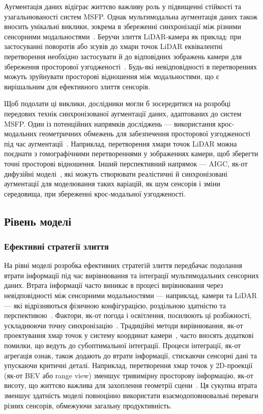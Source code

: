 Аугментація даних відіграє життєво важливу роль у підвищенні стійкості та узагальнюваності систем MSFP.
Однак мультимодальна аугментація даних також вносить унікальні виклики, зокрема в збереженні синхронізації між різними сенсорними модальностями~\cite{wang2021pointaugmenting, rangesh2021predicting}.
Беручи злиття LiDAR-камера як приклад: при застосуванні поворотів або зсувів до хмари точок LiDAR еквівалентні перетворення необхідно застосувати й до відповідних зображень камери для збереження просторової узгодженості~\cite{xiao2022polarmix}. Будь-які невідповідності в перетвореннях можуть зруйнувати просторові відношення між модальностями, що є вирішальним для ефективного злиття сенсорів.

Щоб подолати ці виклики, дослідники могли б зосередитися на розробці передових технік синхронізованої аугментації даних, адаптованих до систем MSFP. Один із потенційних напрямків досліджень — використання крос-модальних геометричних обмежень для забезпечення просторової узгодженості під час аугментації~\cite{yuan2023camera}.
Наприклад, перетворення хмари точок LiDAR можна поєднати з гомографічними перетвореннями у зображеннях камери, щоб зберегти точні просторові відношення.
Інший перспективний напрямок — AIGC, як-от дифузійні моделі~\cite{croitoru2023diffusion}, які можуть створювати реалістичні й синхронізовані аугментації для моделювання таких варіацій, як шум сенсорів і зміни середовища, при збереженні крос-модальної узгодженості.


\subsection{Рівень моделі}

\subsubsection{Ефективні стратегії злиття}

На рівні моделі розробка ефективних стратегій злиття передбачає подолання втрати інформації під час вирівнювання та інтеграції мультимодальних сенсорних даних. Втрата інформації часто виникає в процесі вирівнювання через невідповідності між сенсорними модальностями — наприклад, камери та LiDAR — які відрізняються фізичною конфігурацією, роздільною здатністю та перспективою~\cite{meyer2019sensor}. Фактори, як-от погода і освітлення, посилюють ці розбіжності, ускладнюючи точну синхронізацію~\cite{zhang2023perception}. Традиційні методи вирівнювання, як-от проектування хмар точок у систему координат камери~\cite{zhong2021survey}, часто вносять додаткові помилки, що ведуть до субоптимальної інтеграції.
Процеси інтеграції, як-от агрегація ознак, також додають до втрати інформації, стискаючи сенсорні дані та упускаючи критичні деталі. Наприклад, перетворення хмар точок у 2D-проекції (як-от BEV або range view) зменшує тривимірну просторову інформацію, як-от висоту, що життєво важлива для захоплення геометрії сцени~\cite{zhao2024bev, chang2023bev}. Ця сукупна втрата зменшує здатність моделі повноцінно використати взаємодоповнювальні переваги різних сенсорів, обмежуючи загальну продуктивність.


